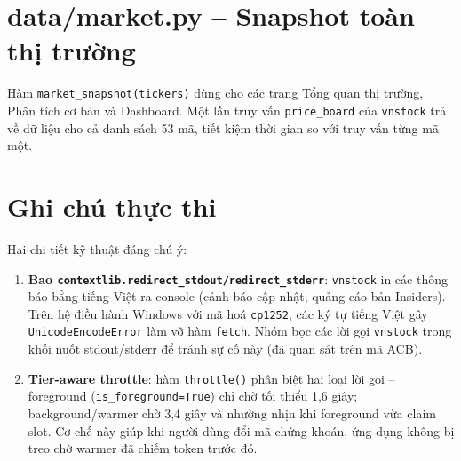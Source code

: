 \documentclass[12pt,a4paper]{article}
\begin{document}

\section{data/market.py -- Snapshot toàn thị trường}

\noindent Hàm \texttt{market\_snapshot(tickers)} dùng cho các trang Tổng
quan thị trường, Phân tích cơ bản và Dashboard. Một lần truy vấn
\texttt{price\_board} của \texttt{vnstock} trả về dữ liệu cho cả danh
sách 53 mã, tiết kiệm thời gian so với truy vấn từng mã một.


\section{Ghi chú thực thi}

\noindent Hai chi tiết kỹ thuật đáng chú ý:

\begin{enumerate}
  \item \textbf{Bao \texttt{contextlib.redirect\_stdout/redirect\_stderr}}:
        \texttt{vnstock} in các thông báo bằng tiếng Việt ra console
        (cảnh báo cập nhật, quảng cáo bản Insiders). Trên hệ điều hành
        Windows với mã hoá \texttt{cp1252}, các ký tự tiếng Việt gây
        \texttt{UnicodeEncodeError} làm vỡ hàm \texttt{fetch}. Nhóm
        bọc các lời gọi \texttt{vnstock} trong khối nuốt stdout/stderr
        để tránh sự cố này (đã quan sát trên mã ACB).

  \item \textbf{Tier-aware throttle}: hàm \texttt{throttle()} phân biệt
        hai loại lời gọi -- foreground (\texttt{is\_foreground=True})
        chỉ chờ tối thiểu 1,6 giây; background/warmer chờ 3,4 giây và
        nhường nhịn khi foreground vừa claim slot. Cơ chế này giúp khi
        người dùng đổi mã chứng khoán, ứng dụng không bị treo chờ
        warmer đã chiếm token trước đó.
\end{enumerate}
\end{document}
